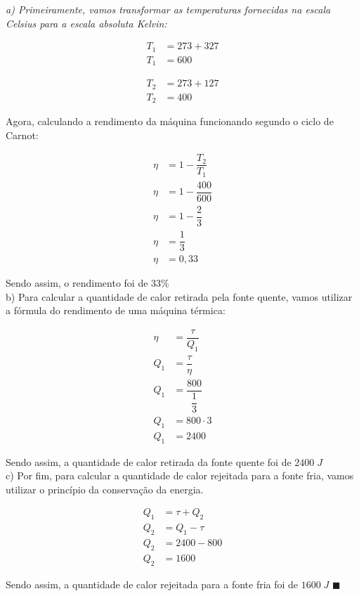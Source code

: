\documentclass[12pt]{article}
\newenvironment{resposta*}
{\bf Resposta:\\ }
{}
\begin{document}
\begin{resposta*}
{\it a) Primeiramente, vamos transformar as temperaturas fornecidas na escala Celsius para a escala absoluta Kelvin:

\begin{align*}
T_{1} &= 273+327\\
T_{1} &= 600
\end{align*}

\begin{align*}
T_{2} &= 273+127\\
T_{2} &= 400
\end{align*}

Agora, calculando a rendimento da máquina funcionando segundo o ciclo de Carnot:

\begin{align*}
\eta &= 1-\dfrac{T_{2}}{T_{1}}\\
\eta &= 1-\dfrac{400}{600}\\
\eta &= 1-\dfrac{2}{3}\\
\eta &= \dfrac{1}{3}\\
\eta &= 0,33
\end{align*}

Sendo assim, o rendimento foi de $\boxed{33\%}$ \\

b) Para calcular a quantidade de calor retirada pela fonte quente, vamos utilizar a fórmula do rendimento de uma máquina térmica:

\begin{align*}
\eta &= \dfrac{\tau}{Q_{1}} \\
Q_{1} &= \dfrac{\tau}{\eta} \\
Q_{1} &= \dfrac{800}{\dfrac{1}{3}} \\
Q_{1} &= 800 \cdot 3 \\
Q_{1} &= 2400
\end{align*}

Sendo assim, a quantidade de calor retirada da fonte quente foi de $\boxed{2400\;J}$ \\

c) Por fim, para calcular a quantidade de calor rejeitada para a fonte fria, vamos utilizar o princípio da conservação da energia.

\begin{align*}
Q_{1} &= \tau + Q_{2} \\
Q_{2} &= Q_{1}-\tau \\
Q_{2} &= 2400-800\\
Q_{2} &= 1600
\end{align*}

Sendo assim, a quantidade de calor rejeitada para a fonte fria foi de $\boxed{1600\;J}$ $\blacksquare$}
\end{resposta*}
\end{document}
